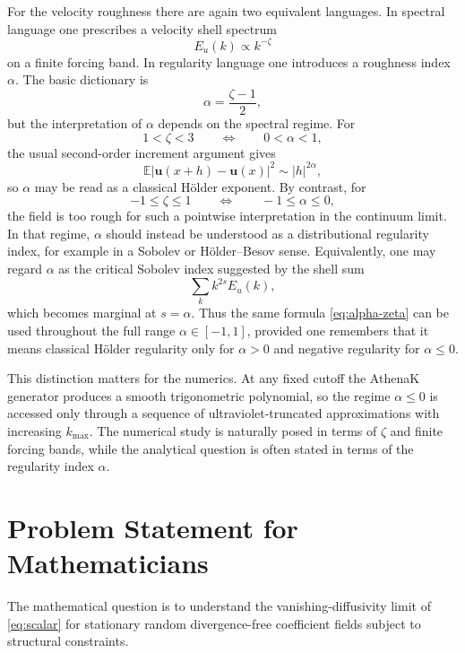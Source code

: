\documentclass[11pt]{article}
\newcommand{\E}{\mathbb{E}}
\newcommand{\uu}{\mathbf{u}}
\begin{document}
For the velocity roughness there are again two equivalent languages. In spectral language one prescribes a velocity shell spectrum
\begin{equation}
E_u(k)\propto k^{-\zeta}
\label{eq:velocity-spectrum}
\end{equation}
on a finite forcing band. In regularity language one introduces a roughness index $\alpha$. The basic dictionary is
\begin{equation}
\alpha = \frac{\zeta-1}{2},
\label{eq:alpha-zeta}
\end{equation}
but the interpretation of $\alpha$ depends on the spectral regime. For
\begin{equation}
1<\zeta<3
\qquad\Longleftrightarrow\qquad
0<\alpha<1,
\end{equation}
the usual second-order increment argument gives
\[
\E |\uu(x+h)-\uu(x)|^2 \sim |h|^{2\alpha},
\]
so $\alpha$ may be read as a classical H\"older exponent. By contrast, for
\begin{equation}
-1\le \zeta \le 1
\qquad\Longleftrightarrow\qquad
-1\le \alpha \le 0,
\end{equation}
the field is too rough for such a pointwise interpretation in the continuum limit. In that regime, $\alpha$ should instead be understood as a distributional regularity index, for example in a Sobolev or H\"older--Besov sense. Equivalently, one may regard $\alpha$ as the critical Sobolev index suggested by the shell sum
\[
\sum_k k^{2s}E_u(k),
\]
which becomes marginal at $s=\alpha$. Thus the same formula \eqref{eq:alpha-zeta} can be used throughout the full range $\alpha\in[-1,1]$, provided one remembers that it means classical H\"older regularity only for $\alpha>0$ and negative regularity for $\alpha\le 0$.

This distinction matters for the numerics. At any fixed cutoff the AthenaK generator produces a smooth trigonometric polynomial, so the regime $\alpha\le 0$ is accessed only through a sequence of ultraviolet-truncated approximations with increasing $k_{\max}$. The numerical study is naturally posed in terms of $\zeta$ and finite forcing bands, while the analytical question is often stated in terms of the regularity index $\alpha$.

\section{Problem Statement for Mathematicians}
The mathematical question is to understand the vanishing-diffusivity limit of \eqref{eq:scalar} for stationary random divergence-free coefficient fields subject to structural constraints.
\end{document}
